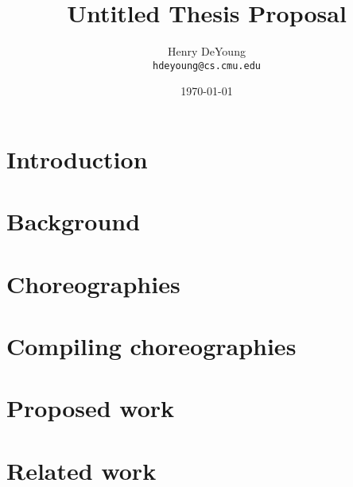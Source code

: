\documentclass{article}
\begin{document}
\title{Untitled Thesis Proposal}
\author{Henry DeYoung\\\texttt{hdeyoung@cs.cmu.edu}}
\date{\today}
\maketitle

\section{Introduction}\label{sec:introduction}



\section{Background}\label{sec:background}



\section{Choreographies}\label{sec:choreographies}



\section{Compiling choreographies}\label{sec:compile-choreo}



\section{Proposed work}\label{sec:extensions}



\section{Related work}\label{sec:related-work}



\printbibliography
\end{document}
